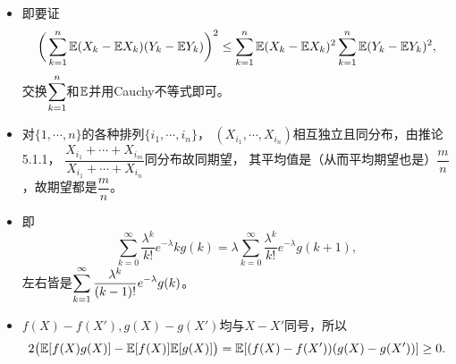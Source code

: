 \begin{itemize}
    \item[6.19]
    即要证
    $$\bigg(\sum_{k=1}^n\mathbb{E}(X_k-\mathbb{E} X_k)(Y_k-\mathbb{E} Y_k)\bigg)^2
    \le\sum_{k=1}^n\mathbb{E}(X_k-\mathbb{E} X_k)^2\sum_{k=1}^n\mathbb{E}(Y_k-\mathbb{E} Y_k)^2,$$
    交换$\displaystyle \sum_{k=1}^n$和$\mathbb{E}$并用Cauchy不等式即可。

    \item[6.34]
    对$\{1,\cdots,n\}$的各种排列$\{i_1,\cdots,i_n\}$，
    $(X_{i_1},\cdots,X_{i_n})$相互独立且同分布，由推论5.1.1，
    $\dfrac{X_{i_1}+\cdots+X_{i_m}}{X_{i_1}+\cdots+X_{i_n}}$同分布故同期望，
    其平均值是（从而平均期望也是）$\dfrac{m}{n}$，故期望都是$\dfrac{m}{n}$。

    \item[6.35]
    即$$\sum_{k=0}^\infty\frac{\lambda^k}{k!}e^{-\lambda}kg(k)
    =\lambda\sum_{k=0}^\infty\frac{\lambda^k}{k!}e^{-\lambda}g(k+1),$$
    左右皆是$\displaystyle \sum_{k=1}^\infty\frac{\lambda^k}{(k-1)!}e^{-\lambda}g(k)$。

    \item[6.38]
    $f(X)-f(X'),g(X)-g(X')$均与$X-X'$同号，所以
    $$2\big(\mathbb{E}[f(X)g(X)]-\mathbb{E}[f(X)]\mathbb{E}[g(X)]\big)
    =\mathbb{E}[(f(X)-f(X'))(g(X)-g(X'))]\ge0.$$
\end{itemize}

